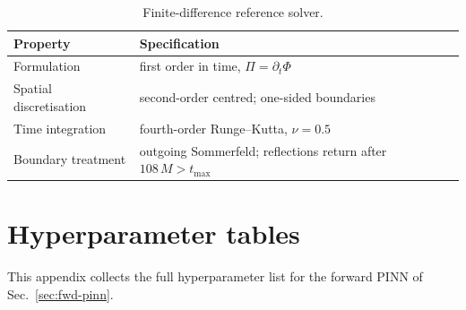 \documentclass[11pt,a4paper]{article}
\theoremstyle{definition}
\begin{document}
\begin{table}[!htbp]
\centering
\caption{Finite-difference reference solver.}
\label{tab:fd-scheme}
\footnotesize
\begin{tabular}{ll}
\toprule
Property & Specification \\
\midrule
Formulation & first order in time, $\Pi=\partial_t\Phi$ \\
Spatial discretisation & second-order centred; one-sided boundaries \\
Time integration & fourth-order Runge--Kutta, $\nu=0.5$ \\
Boundary treatment & outgoing Sommerfeld; reflections return after $108\,M>t_{\max}$ \\
\bottomrule
\end{tabular}
\end{table}



\section{Hyperparameter tables}\label{app:hyper}

This appendix collects the full hyperparameter list for the
forward PINN of Sec.~\ref{sec:fwd-pinn}.
\end{document}
